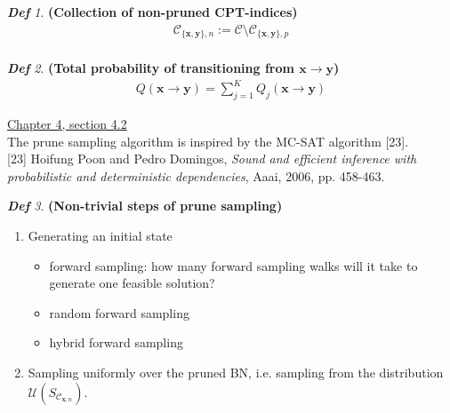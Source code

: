 \documentclass{amsart}
\newcommand{\bfx}{{\mathbf{x}}}
\newcommand{\bfy}{{\mathbf{y}}}
\theoremstyle{plain}
\theoremstyle{remark}
\newtheorem*{definition*}{\textbf{\em Def}}
\theoremstyle{plain}
\newcommand{\C}{{\mathcal C}}
\newcommand{\U}{{\mathcal{U}}}
\newcommand{\vs}{\vspace{0.75pc}}
\begin{document}
\begin{definition*}\textbf{ (Collection of non-pruned CPT-indices) }
\begin{align*}
\C_{\{\bfx,\bfy\},n}:=\C \setminus \C_{\{\bfx,\bfy\},p}\\
\end{align*}
\end{definition*}\vs 

\begin{definition*}\textbf{ (Total probability of transitioning from $\bfx \to \bfy$) }
\begin{align*}
Q(\bfx \to \bfy) = \sum_{j=1}^K Q_j(\bfx \to \bfy)
\end{align*}
\end{definition*}\vs 

\underline{Chapter 4, section 4.2} \\

The prune sampling algorithm is inspired by the MC-SAT algorithm [23]. \\

[23] Hoifung Poon and Pedro Domingos, \textit{Sound and efficient inference with probabilistic and deterministic dependencies}, Aaai, 2006, pp. 458-463. \\

\begin{definition*}\textbf{ (Non-trivial steps of prune sampling) }
\begin{enumerate}[1)]
\item Generating an initial state
\begin{itemize}
\item forward sampling: how many forward sampling walks will it take to generate one feasible solution?
\item random forward sampling
\item hybrid forward sampling 
\end{itemize}
\item Sampling uniformly over the pruned BN, i.e. sampling from the distribution $\U(S_{\C_{\bfx,n}})$.
\end{enumerate}
\end{definition*}\vspace{2pc} 
\end{document}
